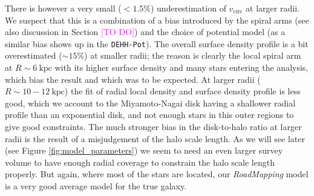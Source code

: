 \documentclass[iop,revtex4,numberedappendix,appendixfloats]{emulateapj}
\newcommand{\RM}{{\sl RoadMapping}}
\newcommand{\Wilma}[1]{\textcolor{Magenta}{#1}}
\begin{document}
There is however a very small ($<1.5\%$) underestimation of $v_\text{circ}$ at larger radii. We suspect that this is a combination of a bias introduced by the spiral arms (see also discussion in Section \Wilma{[TO DO]}) and the choice of potential model (as a similar bias shows up in the \texttt{DEHH-Pot}). The overall surface density profile is a bit overestimated ($\sim 15\%$) at smaller radii; the reason is clearly the local spiral arm at $R\sim6~\text{kpc}$ with its higher surface density  and many stars entering the analysis, which bias the result and which was to be expected. At larger radii ($R\sim10-12~\text{kpc}$) the fit of radial local density and surface density profile is less good, which we account to the Miyamoto-Nagai disk having a shallower radial profile than an exponential disk, and not enough stars in this outer regions to give good constraints. The much stronger bias in the disk-to-halo ratio at larger radii is the result of a misjudgement of the halo scale length. As we will see later (see Figure \ref{fig:model_parameters}) we seem to need an even larger survey volume to have enough radial coverage to constrain the halo scale length properly. But again, where most of the stars are located, our \RM{} model is a very good average model for the true galaxy.
\end{document}

